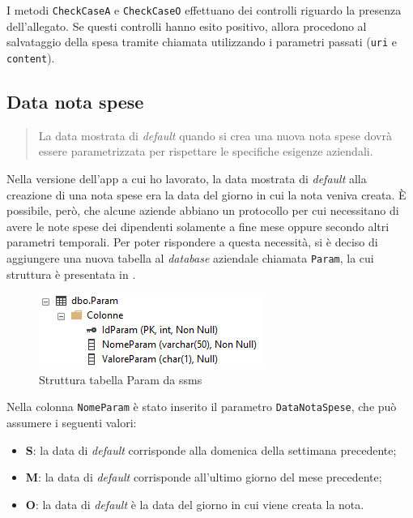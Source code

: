 \noindent I metodi \texttt{CheckCaseA} e \texttt{CheckCaseO} effettuano dei controlli riguardo la presenza dell'allegato. Se questi controlli hanno esito positivo, allora procedono al salvataggio della spesa tramite chiamata  utilizzando i parametri passati (\texttt{uri} e \texttt{content}).

\subsection{Data nota spese}

\begin{quote}
    La data mostrata di \textit{default} quando si crea una nuova nota spese dovrà essere parametrizzata per rispettare le specifiche esigenze aziendali.
\end{quote}

\noindent Nella versione dell'app a cui ho lavorato, la data mostrata di \textit{default} alla creazione di una nota spese era la data del giorno in cui la nota veniva creata. È possibile, però, che alcune aziende abbiano un protocollo per cui necessitano di avere le note spese dei dipendenti solamente a fine mese oppure secondo altri parametri temporali. Per poter rispondere a questa necessità, si è deciso di aggiungere una nuova tabella al \textit{database} aziendale chiamata \texttt{Param}, la cui struttura è presentata in .

\begin{figure}[H]
    \centering
    \includegraphics[width=.5\columnwidth]{images/paramTable.png}
    \caption{Struttura tabella Param da \acrshort{ssms}}
    \label{fig:paramtable}
\end{figure}

\noindent Nella colonna \texttt{NomeParam} è stato inserito il parametro \texttt{DataNotaSpese}, che può assumere i seguenti valori:
\begin{itemize}
    \item \textbf{S}: la data di \textit{default} corrisponde alla domenica della settimana precedente;
    \item \textbf{M}: la data di \textit{default} corrisponde all'ultimo giorno del mese precedente;
    \item \textbf{O}: la data di \textit{default} è la data del giorno in cui viene creata la nota.
\end{itemize}

